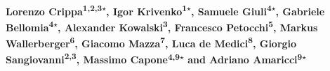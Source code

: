 \documentclass[dvipsnames]{SciPost}
\begin{document}
\pagestyle{SPstyle}

\begin{center}{\Large \textbf{\color{scipostdeepblue}{
EDIpack: A generic and interoperable Lanczos-based solver for quantum impurity problems\\
}}}\end{center}


\begin{center}\textbf{
    Lorenzo Crippa\textsuperscript{1,2,3$\star$},
    Igor Krivenko\textsuperscript{1$\star$},
    Samuele Giuli\textsuperscript{4$\star$},
    Gabriele Bellomia\textsuperscript{4$\star$},
    Alexander Kowalski\textsuperscript{3},
    Francesco Petocchi\textsuperscript{5},
    Markus Wallerberger\textsuperscript{6},
    Giacomo Mazza\textsuperscript{7},
    Luca de Medici\textsuperscript{8},
    Giorgio Sangiovanni\textsuperscript{2,3},
    Massimo Capone\textsuperscript{4,9$\star$} and 
    Adriano Amaricci\textsuperscript{9$\star$}    
}\end{center}
\end{document}

